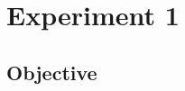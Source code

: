 \documentclass[twoside,twocolumn]{article}
\begin{document}
\section{Experiment 1}
\label{sec:simulation}

\subsection{Objective}

%
%
%
%
%
\end{document}
